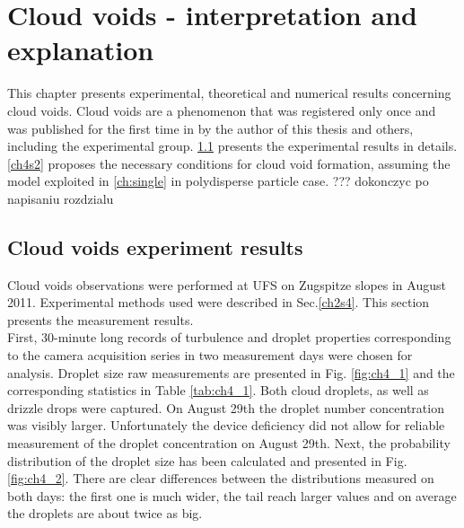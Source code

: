 \documentclass[../main.tex]{subfiles}
\begin{document}
\chapter{Cloud voids - interpretation and explanation} %

\label{ch:holes} %

This chapter presents experimental, theoretical and numerical results concerning cloud voids. Cloud voids are a phenomenon that was registered only once and was published for the first time in \citet{Karpinska2019} by the author of this thesis and others, including the experimental group. \ref{ch4s1} presents the experimental results in details. \ref{ch4s2} proposes the necessary conditions for cloud void formation, assuming the model exploited in \autoref{ch:single} in polydisperse particle case. ??? dokonczyc po napisaniu rozdzialu

\section{Cloud voids experiment results}
\label{ch4s1}
Cloud voids observations were performed at UFS on Zugspitze slopes in August 2011. Experimental methods used were described in Sec.\autoref{ch2s4}. This section presents the measurement results.\\
First, 30-minute long records of turbulence and droplet properties corresponding to the camera acquisition series in two measurement days were chosen for analysis. Droplet size raw measurements are presented in Fig. \ref{fig:ch4_1} and the corresponding statistics in Table \ref{tab:ch4_1}. Both cloud droplets, as well as drizzle drops were captured. On August 29th the droplet number concentration was visibly larger. Unfortunately the device deficiency did not allow for reliable measurement of the droplet concentration on August 29th. Next, the probability distribution of the droplet size has been calculated and presented in Fig.\ref{fig:ch4_2}. There are clear differences between the distributions measured on both days: the first one is much wider, the tail reach larger values and on average the droplets are about twice as big.
\end{document}
